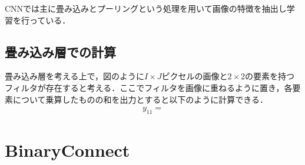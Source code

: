 CNNでは主に畳み込みとプーリングという処理を用いて画像の特徴を抽出し学習を行っている．

\subsection{畳み込み層での計算}
畳み込み層を考える上で，図のように$I \times J$ピクセルの画像と$2 \times 2$の要素を持つフィルタが存在すると考える．ここでフィルタを画像に重ねるように置き，各要素について乗算したものの和を出力とすると以下のように計算できる．
\begin{align*}
  y_{11} = 
\end{align*}

\section{BinaryConnect}

